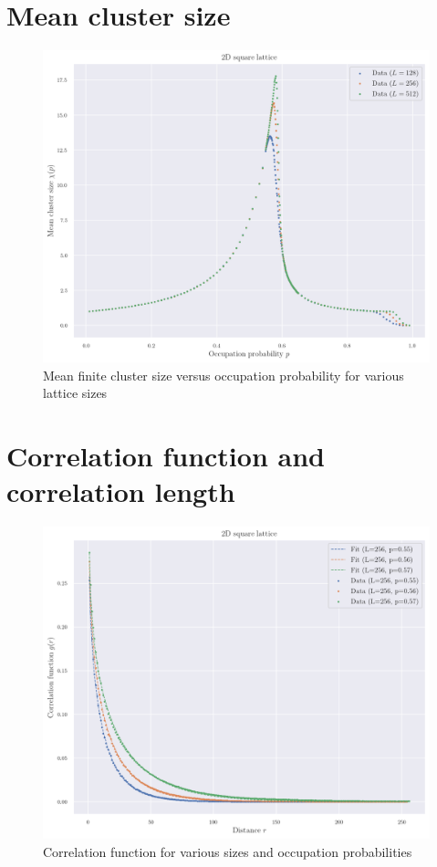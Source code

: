 \section{Mean cluster size}



\begin{figure}[H]
  \includegraphics[width=\linewidth]{Images/sec3_mean_cluster_size_1.png}
  \caption{Mean finite cluster size versus occupation probability for various lattice sizes}
  \label{fig:sec3_mean_cluster_size_1}
\end{figure}


\section{Correlation function and correlation length}




\begin{figure}[H]
  \includegraphics[width=\linewidth]{Images/sec3_corr_func_1.png}
  \caption{Correlation function for various sizes and occupation probabilities}
  \label{fig:sec3_corr_func_1}
\end{figure}


